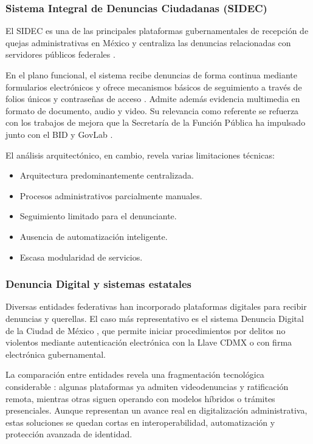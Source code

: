 	\subsubsection{Sistema Integral de Denuncias Ciudadanas (SIDEC)}
	El SIDEC es una de las principales plataformas gubernamentales de recepción de quejas
	administrativas en México y centraliza las denuncias relacionadas con servidores públicos federales
	\cite{sfp_sidec}.
	
	En el plano funcional, el sistema recibe denuncias de forma continua mediante formularios
	electrónicos y ofrece mecanismos básicos de seguimiento a través de folios únicos y contraseñas de
	acceso \cite{amexcid_sidec}. Admite además evidencia multimedia en formato de documento, audio y
	video. Su relevancia como referente se refuerza con los trabajos de mejora que la Secretaría de la
	Función Pública ha impulsado junto con el BID y GovLab \cite{sfp_bid_govlab_sidec}.
	
	El análisis arquitectónico, en cambio, revela varias limitaciones técnicas:
	
	\begin{itemize}
		\item Arquitectura predominantemente centralizada.
		\item Procesos administrativos parcialmente manuales.
		\item Seguimiento limitado para el denunciante.
		\item Ausencia de automatización inteligente.
		\item Escasa modularidad de servicios.
	\end{itemize}
	
	\subsubsection{Denuncia Digital y sistemas estatales}
	Diversas entidades federativas han incorporado plataformas digitales para recibir denuncias y
	querellas. El caso más representativo es el sistema Denuncia Digital de la Ciudad de México
	\cite{cdmx_denuncia_digital}, que permite iniciar procedimientos por delitos no violentos mediante
	autenticación electrónica con la Llave CDMX o con firma electrónica gubernamental.
	
	La comparación entre entidades revela una fragmentación tecnológica considerable
	\cite{impunidadcero_denuncia_digital}: algunas plataformas ya admiten videodenuncias y ratificación
	remota, mientras otras siguen operando con modelos híbridos o trámites presenciales. Aunque
	representan un avance real en digitalización administrativa, estas soluciones se quedan cortas en
	interoperabilidad, automatización y protección avanzada de identidad.
	
